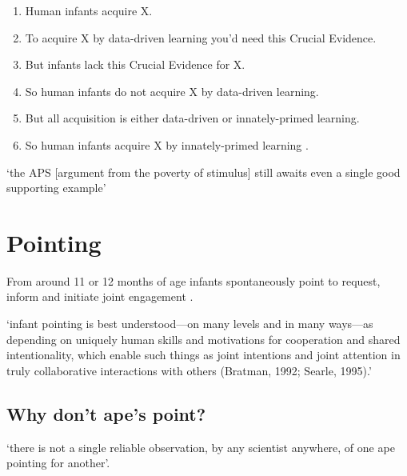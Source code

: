 \documentclass[12pt]{extarticle}
\begin{document}
\begin{multicols}{3}
\begin{enumerate}
\item
 
Human infants acquire X.
 
\item
 
To acquire X by data-driven learning you'd need this Crucial Evidence.
 
\item
 
But infants lack this Crucial Evidence for X.
 
\item
 
So human infants do not acquire X by data-driven learning.
 
\item
 
But all acquisition is either data-driven or innately-primed learning.
 
\item
 
So human infants acquire X by innately-primed learning .
 
\end{enumerate}
 
‘the APS [argument from the poverty of stimulus] still awaits even a single good supporting example’
\citep[p.\ 47]{pullum:2002_empirical}
 
 
 
\section{Pointing}
 
From around 11 or 12 months of age infants spontaneously point to request, inform and initiate joint engagement \citep{Liszkowski:2007mm}.
 
‘infant pointing is best understood---on many levels and in many ways---as depending on uniquely human skills and motivations for cooperation and shared intentionality, which enable such things as joint intentions and joint attention in truly collaborative interactions with others (Bratman, 1992; Searle, 1995).’
\citep[p.\ 706]{Tomasello:2007fi}
 
\subsection{Why don’t ape’s point?}
 
‘there is not a single reliable observation, by any scientist anywhere, of one ape pointing for another’.
\citep[p.\ 507]{Tomasello:2010dy}
 

\end{multicols}
\end{document}
